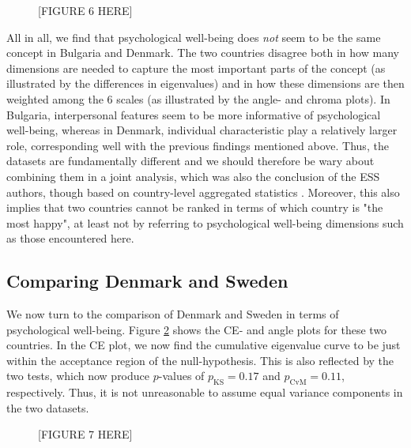 \documentclass[a4paper,14pt]{article}
\begin{document}
\begin{figure}[!h]
\caption{[FIGURE 6 HERE]}
\label{plotBG.pancake}
\end{figure}

All in all, we find that psychological well-being does \textit{not} seem to be the same concept in Bulgaria and Denmark. The two countries disagree both in how many dimensions are needed to capture the most important parts of the concept (as illustrated by the differences in eigenvalues) and in how these dimensions are then weighted among the 6 scales (as illustrated by the angle- and chroma plots). In Bulgaria, interpersonal features seem to be more informative of psychological well-being, whereas in Denmark, individual characteristic play a relatively larger role, corresponding well with the previous findings mentioned above. Thus, the datasets are fundamentally different and we should therefore be wary about combining them in a joint analysis, which was also the conclusion of the ESS authors, though based on country-level aggregated statistics \cite{ESStopline5}. Moreover, this also implies that two countries cannot be ranked in terms of which country is "the most happy", at least not by referring to psychological well-being dimensions such as those encountered here.

\subsection*{Comparing Denmark and Sweden}
We now turn to the comparison of Denmark and Sweden in terms of psychological well-being. Figure \ref{plotSE.cehair} shows the CE- and angle plots for these two countries. In the CE plot, we now find the cumulative eigenvalue curve to be just within the acceptance region of the null-hypothesis. This is also reflected by the two tests, which now produce $p$-values of $p_\text{KS} = 0.17$ and $p_\text{CvM} = 0.11$, respectively. Thus, it is not unreasonable to assume equal variance components in the two datasets.

\begin{figure}[!h]
\caption{[FIGURE 7 HERE]}
\label{plotSE.cehair}
\end{figure}
\end{document}
